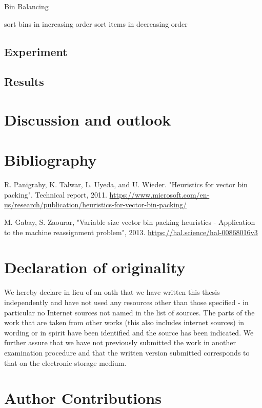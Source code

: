 \documentclass[a4paper,11pt,titlepage]{article}
\begin{document}
\begin{algorithm}
	
	\caption{Bin Balancing}\label{alg:two}
	sort bins in increasing order\;
	sort items in decreasing order\;
	
	
\end{algorithm}


\subsection{Experiment}
\subsection{Results}

\section{Discussion and outlook}
\lipsum[1-4]
\section{Bibliography}
\begin{thebibliography}{2}
    R. Panigrahy, K. Talwar, L. Uyeda, and U. Wieder. "Heuristics for vector bin packing". Technical report, 2011. \url{https://www.microsoft.com/en-us/research/publication/heuristics-for-vector-bin-packing/}

    M. Gabay, S. Zaourar, "Variable size vector bin packing heuristics - Application to the machine reassignment problem", 2013. \url{https://hal.science/hal-00868016v3} 
\end{thebibliography}
\section{Declaration of originality}
We hereby declare in lieu of an oath that we have written this thesis independently and have not used any resources other than those specified - in particular no Internet sources not named in the list of sources. The parts of the work that are taken from other works (this also includes internet sources) in wording or in spirit have been identified and the source has been indicated. We further assure that we have not previously submitted the work in another examination procedure and that the written version submitted corresponds to that on the electronic storage medium.

\section{Author Contributions} 
\end{document}
